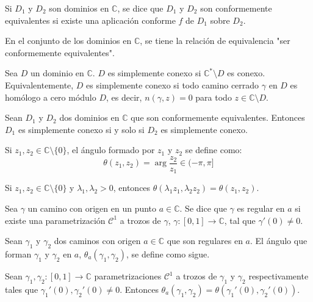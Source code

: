 \begin{definition}
    Si $D_1$ y $D_2$ son dominios en $\mathbb{C}$, se dice que $D_1$ y $D_2$ son conformemente equivalentes si existe una aplicación conforme $f$ de $D_1$ sobre $D_2$.

    En el conjunto de los dominios en $\mathbb{C}$, se tiene la relación de equivalencia "ser conformemente equivalentes".
\end{definition}

\begin{definition}
    Sea $D$ un dominio en $\mathbb{C}$.
    $D$ es simplemente conexo si $\mathbb{C}^\ast \setminus D$ es conexo.
    Equivalentemente, $D$ es simplemente conexo si todo camino cerrado $\gamma$ en $D$ es homólogo a cero módulo $D$, es decir, $n(\gamma, z) = 0$ para todo $z \in \mathbb{C} \setminus D$.
\end{definition}

\begin{theorem}
    Sean $D_1$ y $D_2$ dos dominios en $\mathbb{C}$ que son conformemente equivalentes.
    Entonces $D_1$ es simplemente conexo si y solo si $D_2$ es simplemente conexo.
\end{theorem}

\begin{definition}
    Si $z_1, z_2 \in \mathbb{C} \setminus \{0\}$, el ángulo formado por $z_1$ y $z_2$ se define como:
    $$\theta(z_1, z_2) = \arg \frac{z_2}{z_1} \in (-\pi, \pi]$$
\end{definition}

\begin{remark}
    Si $z_1, z_2 \in \mathbb{C} \setminus \{0\}$ y $\lambda_1, \lambda_2 > 0$, entonces $\theta(\lambda_1z_1, \lambda_2z_2) = \theta(z_1, z_2)$.
\end{remark}

\begin{definition}
    Sea $\gamma$ un camino con origen en un punto $a \in \mathbb{C}$.
    Se dice que $\gamma$ es regular en $a$ si existe una parametrización $\mathcal{C}^1$ a trozos de $\gamma$, $\gamma: [0, 1] \to \mathbb{C}$, tal que $\gamma'(0) \neq 0$.
\end{definition}

\begin{definition}
    Sean $\gamma_1$ y $\gamma_2$ dos caminos con origen $a \in \mathbb{C}$ que son regulares en $a$.
    El ángulo que forman $\gamma_1$ y $\gamma_2$ en $a$, $\theta_a(\gamma_1, \gamma_2)$, se define como sigue.

    Sean $\gamma_1, \gamma_2: [0, 1] \to \mathbb{C}$ parametrizaciones $\mathcal{C}^1$ a trozos de $\gamma_1$ y $\gamma_2$ respectivamente tales que $\gamma_1'(0), \gamma_2'(0) \neq 0$.
    Entonces $\theta_a(\gamma_1, \gamma_2) = \theta(\gamma_1'(0), \gamma_2'(0))$.
\end{definition}

